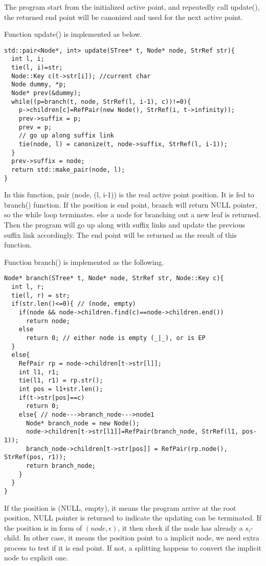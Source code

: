 \documentclass{article}
\begin{document}
The program start from the initialized active point, and repeatedly
call update(), the returned end point will be canonized and used
for the next active point.

Function update() is implemented as below.

\begin{lstlisting}
std::pair<Node*, int> update(STree* t, Node* node, StrRef str){
  int l, i;
  tie(l, i)=str;
  Node::Key c(t->str[i]); //current char
  Node dummy, *p;
  Node* prev(&dummy);
  while((p=branch(t, node, StrRef(l, i-1), c))!=0){
    p->children[c]=RefPair(new Node(), StrRef(i, t->infinity));
    prev->suffix = p;
    prev = p;
    // go up along suffix link
    tie(node, l) = canonize(t, node->suffix, StrRef(l, i-1));
  }
  prev->suffix = node;
  return std::make_pair(node, l);
}
\end{lstlisting}

In this function, pair (node, (l, i-1)) is the real active point
position. It is fed to branch() function. If the position is
end point, branch will return NULL pointer, so the while loop
terminates. else a node for branching out a new leaf is returned.
Then the program will go up along with suffix links and update
the previous suffix link accordingly. The end point will be
returned as the result of this function.

Function branch() is implemented as the following.

\begin{lstlisting}
Node* branch(STree* t, Node* node, StrRef str, Node::Key c){
  int l, r;
  tie(l, r) = str;
  if(str.len()<=0){ // (node, empty)
    if(node && node->children.find(c)==node->children.end())
      return node;
    else
      return 0; // either node is empty (_|_), or is EP
  }
  else{
    RefPair rp = node->children[t->str[l]];
    int l1, r1;
    tie(l1, r1) = rp.str();
    int pos = l1+str.len();
    if(t->str[pos]==c)
      return 0;
    else{ // node--->branch_node--->node1
      Node* branch_node = new Node();
      node->children[t->str[l1]]=RefPair(branch_node, StrRef(l1, pos-1));
      branch_node->children[t->str[pos]] = RefPair(rp.node(), StrRef(pos, r1));
      return branch_node;
    }
  }
}
\end{lstlisting}

If the position is (NULL, empty), it means the program arrive at the
root position, NULL pointer is returned to indicate the updating can
be terminated. If the position is in form of $(node, \epsilon)$, it 
then check if the node has already a $s_i$-child. In other case, it
means the position point to a implicit node, we need extra process
to test if it is end point. If not, a splitting happens to convert the
implicit node to explicit one.
\end{document}
